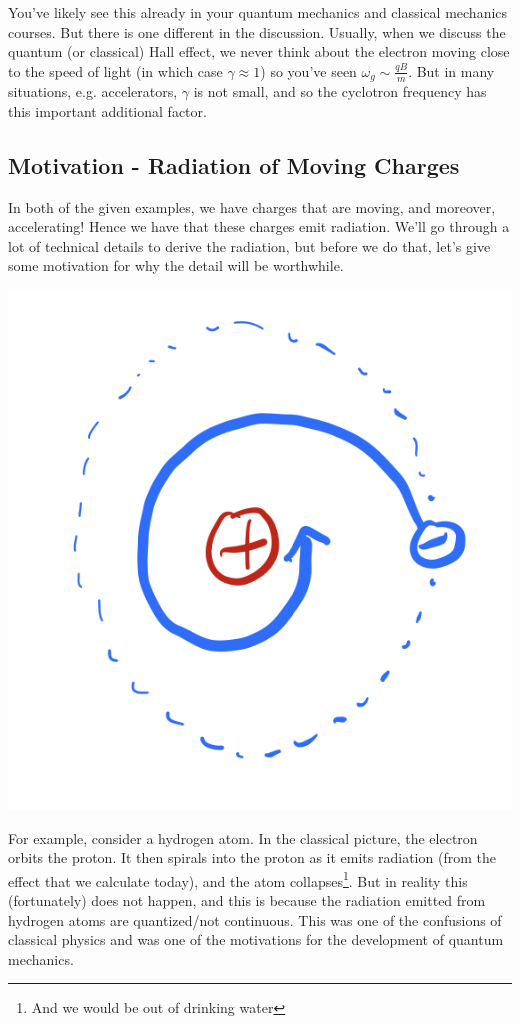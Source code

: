 You've likely see this already in your quantum mechanics and classical mechanics courses. But there is one different in the discussion. Usually, when we discuss the quantum (or classical) Hall effect, we never think about the electron moving close to the speed of light (in which case $\gamma \approx 1$) so you've seen $\omega_g \sim \frac{qB}{m}$. But in many situations, e.g. accelerators, $\gamma$ is not small, and so the cyclotron frequency has this important additional factor.

\subsection{Motivation - Radiation of Moving Charges}
In both of the given examples, we have charges that are moving, and moreover, accelerating! Hence we have that these charges emit radiation. We'll go through a lot of technical details to derive the radiation, but before we do that, let's give some motivation for why the detail will be worthwhile.

\begin{center}
    \includegraphics[scale=0.4]{Lectures/Images/lec8-hydrogen.png}
\end{center}

For example, consider a hydrogen atom. In the classical picture, the electron orbits the proton. It then spirals into the proton as it emits radiation (from the effect that we calculate today), and the atom collapses\footnote{And we would be out of drinking water}. But in reality this (fortunately) does not happen, and this is because the radiation emitted from hydrogen atoms are quantized/not continuous. This was one of the confusions of classical physics and was one of the motivations for the development of quantum mechanics.

